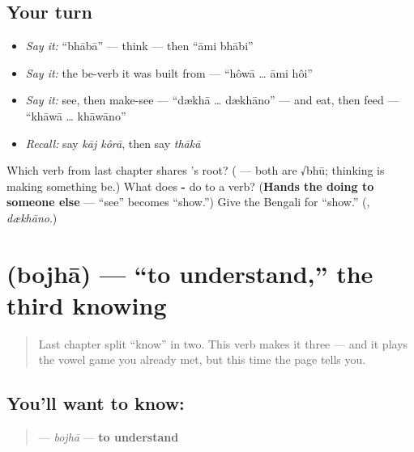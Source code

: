 \subsection*{Your turn}
\begin{itemize}
\raggedright
  \item \emph{Say it:} \textquotedblleft{}bhābā\textquotedblright{} — think — then \textquotedblleft{}āmi bhābi\textquotedblright{}
  \item \emph{Say it:} the be-verb it was built from — \textquotedblleft{}hôwā … āmi hôi\textquotedblright{}
  \item \emph{Say it:} see, then make-see — \textquotedblleft{}dækhā … dækhāno\textquotedblright{} — and eat, then feed — \textquotedblleft{}khāwā … khāwāno\textquotedblright{}
  \item \emph{Recall:} say \emph{kāj kôrā}, then say \emph{thākā}
\end{itemize}

\begin{tcolorbox}[breakable,colback=teal!4,colframe=teal!35!black,title={Before you move on}]
Which verb from last chapter shares 's root? (\textbf{} — both are √bhū; thinking is making something be.) What does \textbf{-} do to a verb? (\textbf{Hands the doing to someone else} —  \textquotedblleft{}see\textquotedblright{} becomes  \textquotedblleft{}show.\textquotedblright{}) Give the Bengali for \textquotedblleft{}show.\textquotedblright{} (\textbf{}, \emph{dækhāno}.)
\end{tcolorbox}
\section[\texorpdfstring{\bn{বোঝা} (bojhā)}{বোঝা (bojhā)}]{ (bojhā) — \textquotedblleft{}to understand,\textquotedblright{} the third knowing}

\label{lesson:BN-C08-bojha}



\begin{quote}
Last chapter split \textquotedblleft{}know\textquotedblright{} in two. This verb makes it three — and it plays the vowel game you already met, but this time the page tells you.
\end{quote}

\subsection*{You'll want to know: }
\begin{quote}
\textbf{} — \emph{bojhā} — \textbf{to understand}
\end{quote}

